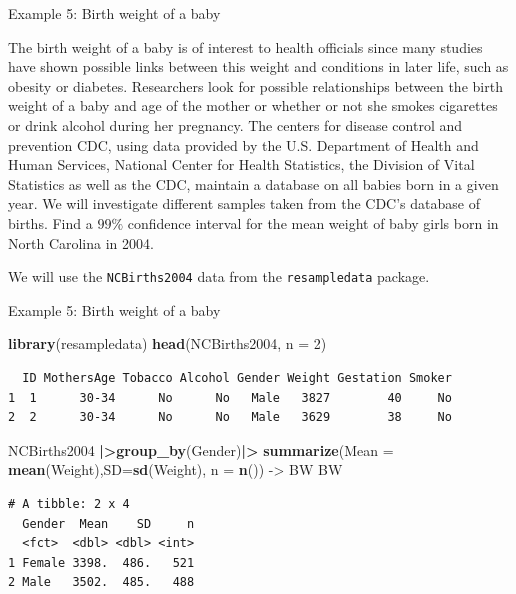 \documentclass[
  ignorenonframetext,
]{beamer}
\newenvironment{Shaded}{\begin{snugshade}}{\end{snugshade}}
\newcommand{\AttributeTok}[1]{\textcolor[rgb]{0.13,0.29,0.53}{#1}}
\newcommand{\DecValTok}[1]{\textcolor[rgb]{0.00,0.00,0.81}{#1}}
\newcommand{\FunctionTok}[1]{\textcolor[rgb]{0.13,0.29,0.53}{\textbf{#1}}}
\newcommand{\NormalTok}[1]{#1}
\newcommand{\OtherTok}[1]{\textcolor[rgb]{0.56,0.35,0.01}{#1}}
\newcommand{\SpecialCharTok}[1]{\textcolor[rgb]{0.81,0.36,0.00}{\textbf{#1}}}
\begin{document}
\begin{frame}[fragile]{Example 5: Birth weight of a baby}
\protect\hypertarget{example-5-birth-weight-of-a-baby}{}
\begin{tcolorbox}
The birth weight of a baby is of interest to health officials since many studies have shown possible links between this weight and conditions in later life, such as obesity or diabetes. Researchers look for possible relationships between the birth weight of a baby and age of the mother or whether or not she smokes cigarettes or drink alcohol during her pregnancy. The centers for disease control and prevention CDC, using data provided by the U.S. Department of Health and Human Services, National Center for Health Statistics, the Division of Vital Statistics as well as the CDC, maintain a database on all babies born in a given year. We will investigate different samples taken from the CDC’s database of births. Find a $99\%$ confidence interval for the mean weight of baby girls born in North Carolina in 2004.
\end{tcolorbox}

We will use the \texttt{NCBirths2004} data from the
\texttt{resampledata} package.
\end{frame}

\begin{frame}[fragile]{Example 5: Birth weight of a baby}
\protect\hypertarget{example-5-birth-weight-of-a-baby-1}{}
\normalsize

\begin{Shaded}
\begin{Highlighting}[]
\FunctionTok{library}\NormalTok{(resampledata)}
\FunctionTok{head}\NormalTok{(NCBirths2004, }\AttributeTok{n =} \DecValTok{2}\NormalTok{)}
\end{Highlighting}
\end{Shaded}

\begin{verbatim}
  ID MothersAge Tobacco Alcohol Gender Weight Gestation Smoker
1  1      30-34      No      No   Male   3827        40     No
2  2      30-34      No      No   Male   3629        38     No
\end{verbatim}

\begin{Shaded}
\begin{Highlighting}[]
\NormalTok{NCBirths2004 }\SpecialCharTok{|\textgreater{}}\FunctionTok{group\_by}\NormalTok{(Gender)}\SpecialCharTok{|\textgreater{}} 
  \FunctionTok{summarize}\NormalTok{(}\AttributeTok{Mean =} \FunctionTok{mean}\NormalTok{(Weight),}\AttributeTok{SD=}\FunctionTok{sd}\NormalTok{(Weight), }\AttributeTok{n =} \FunctionTok{n}\NormalTok{()) }\OtherTok{{-}\textgreater{}}\NormalTok{ BW}
\NormalTok{BW}
\end{Highlighting}
\end{Shaded}

\begin{verbatim}
# A tibble: 2 x 4
  Gender  Mean    SD     n
  <fct>  <dbl> <dbl> <int>
1 Female 3398.  486.   521
2 Male   3502.  485.   488
\end{verbatim}

\normalsize
\end{frame}
\end{document}
